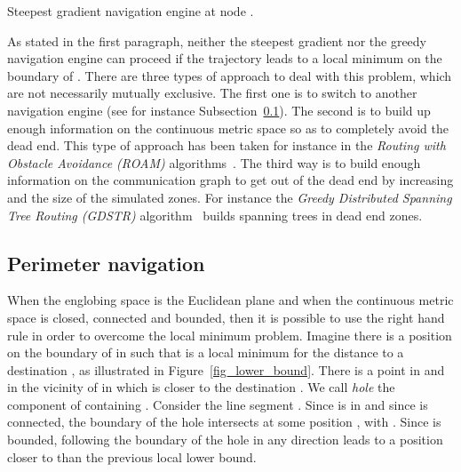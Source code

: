\documentclass{article}
\begin{document}
\begin{table}[h]
\begin{center}
\end{center}
\caption{Steepest gradient navigation engine at node .}
\label{tab_gradient}
\end{table}

As stated in the first paragraph, neither the steepest gradient nor the greedy navigation engine can proceed if the trajectory leads to a local minimum on the boundary of . There are three types of approach to deal with this problem, which are not necessarily mutually exclusive. The first one is to switch to another navigation engine (see for instance Subsection~\ref{sub_perimeter}). The second is to build up enough information on the continuous metric space  so as to completely avoid the dead end. This type of approach has been taken for instance in the {\em Routing with Obstacle Avoidance (ROAM)} algorithms~\cite{bib_roam}. The third way is to build enough information on the communication graph  to get out of the dead end by increasing  and the size of the simulated zones. For instance the {\em Greedy Distributed Spanning Tree Routing (GDSTR)} algorithm~\cite{bib_gdstr} builds spanning trees in dead end zones.


\subsection{Perimeter navigation}
\label{sub_perimeter}

When the englobing space is the Euclidean plane  and when the continuous metric space  is closed, connected and bounded, then it is possible to use the right hand rule in order to overcome the local minimum problem. Imagine there is a position  on the boundary of  in  such that  is a local minimum for the distance to a destination , as illustrated in Figure~\ref{fig_lower_bound}. There is a point  in  and in the vicinity of  in  which is closer to the destination . We call {\em hole} the component of  containing .
 Consider the line segment . Since  is in  and since  is connected, the boundary of the hole intersects  at some position , with . Since  is bounded, following the boundary of the hole in any direction leads to a position closer to  than the previous local lower bound.
\end{document}
